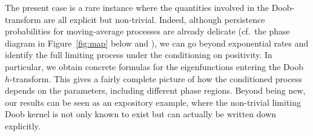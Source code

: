 \documentclass[12pt]{article}
\newcommand{\1}{\mathds{1}}
\theoremstyle{definition}
\theoremstyle{plain}
\theoremstyle{remark}
\begin{document}
The present case is a rare instance where the quantities involved in the Doob-transform are all explicit but non-trivial. Indeed, although persistence probabilities for moving-average processes are already delicate (cf.\ the phase diagram in Figure~\ref{fig:map} below and \cite{AMZ,AurzadaRaschel}), we can go beyond exponential rates and identify the full limiting process under the conditioning on positivity. In particular, we obtain concrete formulas for the eigenfunctions entering the Doob $h$-transform. This gives a fairly complete picture of how the conditioned process depends on the parameters, including different phase regions. Beyond being new, our results can be seen as an expository example, where the non-trivial limiting Doob kernel is not only known to exist but can actually be written down explicitly.
\end{document}
